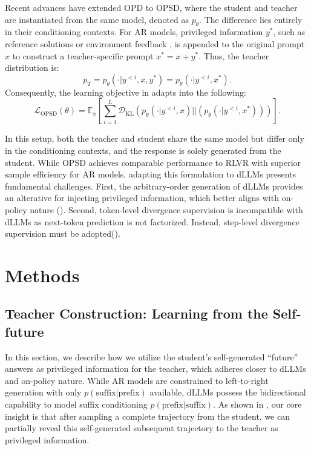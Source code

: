 \documentclass{llmxive}
\begin{document}
Recent advances have extended OPD to OPSD, where the student and teacher are instantiated from the same model, denoted as $p_\theta$. The difference lies entirely in their conditioning contexts. For AR models, privileged information $y^*$, such as reference solutions \citep{zhao2026self} or environment feedback \citep{hubotter2026reinforcement}, is appended to the original prompt $x$ to construct a teacher-specific prompt $x^* = x + y^*$. Thus, the teacher distribution is:
\begin{equation}
    p_T = p_\theta \left( \cdot | y^{<i}, x, y^* \right) = p_\theta \left( \cdot | y^{<i}, x^* \right).
\end{equation}
Consequently, the learning objective in  adapts into the following:
\begin{equation}
    \mathcal{L}_\text{OPSD} (\theta) = \mathbb{E}_x \left[ \sum_{i=1}^L \mathcal{D}_\text{KL} \left(p_\theta \left( \cdot | y^{<i}, x  \right) || \left( p_\theta \left( \cdot | y^{<i}, x^* \right) \right) \right) \right].
\end{equation}

In this setup, both the teacher and student share the same model but differ only in the conditioning contexts, and the response is solely generated from the student. While OPSD achieves comparable performance to RLVR with superior sample efficiency for AR models, adapting this formulation to dLLMs presents fundamental challenges. First, the arbitrary-order generation of dLLMs provides an alterative for injecting privileged information, which better aligns with on-policy nature (). Second, token-level divergence supervision is incompatible with dLLMs as next-token prediction is not factorized. Instead, step-level divergence supervision must be adopted().


\section{Methods}


\subsection{Teacher Construction: Learning from the Self-future} \label{sec3.1}


In this section, we describe how we utilize the student's self-generated ``future'' answers as privileged information for the teacher, which adheres closer to dLLMs and on-policy nature. While AR models are constrained to left-to-right generation with only $p(\text{suffix} | \text{prefix})$ available, dLLMs possess the bidirectional capability to model suffix conditioning $p(\text{prefix} | \text{suffix})$. As shown in , our core insight is that after sampling a complete trajectory from the student, we can partially reveal this self-generated subsequent trajectory to the teacher as privileged information.
\end{document}
